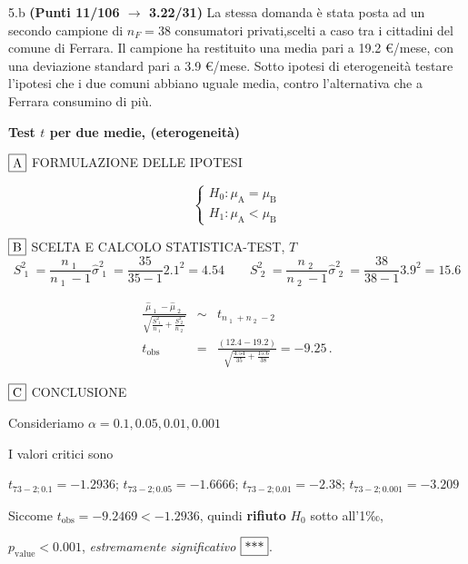 \documentclass[
  11pt,
]{book}
\theoremstyle{mytheoremstyle}
\theoremstyle{mydefstyle}
\newenvironment{sol}
  {
  \begin{tcolorbox}[enhanced,breakable,arc=0.1mm,boxrule=1pt,colback=white,colframe=iblue,
  title=\bf \fontfamily{lmss}\selectfont \hspace{.5 cm} Soluzione,drop fuzzy shadow]

}{
\end{tcolorbox}
  }
\begin{document}
5.b \textbf{(Punti 11/106 \(\rightarrow\) 3.22/31)} La stessa domanda è stata posta ad un secondo campione di \(n_F=38\) consumatori privati,scelti a caso tra i cittadini del comune di Ferrara.
Il campione ha restituito una media pari a 19.2 €/mese, con una deviazione standard pari a 3.9 €/mese. Sotto ipotesi di eterogeneità testare l'ipotesi che i due comuni abbiano uguale media, contro l'alternativa che a Ferrara consumino di più.

\begin{sol}
\textbf{Test \(t\) per due medie, (eterogeneità)}

\(\fbox{A}\) FORMULAZIONE DELLE IPOTESI

\[\begin{cases}
   H_0: \mu_\text{A} = \mu_\text{B} \\
   H_1: \mu_\text{A} < \mu_\text{B} 
   \end{cases}\]

\(\fbox{B}\) SCELTA E CALCOLO STATISTICA-TEST, \(T\)
\[
     S^2_\text{ 1 }=\frac{n_\text{ 1 }}{n_\text{ 1 }-1}\hat\sigma^2_\text{ 1 }=\frac{ 35 }{ 35 -1} 2.1 ^2= 4.54  \qquad
     S^2_\text{ 2 }=\frac{n_\text{ 2 }}{n_\text{ 2 }-1}\hat\sigma^2_\text{ 2 }=\frac{ 38 }{ 38 -1} 3.9 ^2= 15.6 
   \]

\begin{eqnarray*}
   \frac{\hat\mu_\text{ 1 } - \hat\mu_\text{ 2 }}
   {\sqrt{\frac {S^2_\text{ 1 }}{n_\text{ 1 }}+\frac {S^2_\text{ 2 }}{n_\text{ 2 }}}}&\sim&t_{n_\text{ 1 }+n_\text{ 2 }-2}\\
   t_{\text{obs}}
   &=& \frac{ ( 12.4 -  19.2 )} {\sqrt{\frac{ 4.54 }{ 35 }+\frac{ 15.6 }{ 38 }}}
   =   -9.25 \, .
   \end{eqnarray*}

\(\fbox{C}\) CONCLUSIONE

Consideriamo \(\alpha=0.1, 0.05, 0.01, 0.001\)

I valori critici sono

\(t_{73-2;0.1}=-1.2936\); \(t_{73-2;0.05}=-1.6666\); \(t_{73-2;0.01}=-2.38\); \(t_{73-2;0.001}=-3.209\)

Siccome \(t_\text{obs}=-9.2469<-1.2936\), quindi \textbf{rifiuto} \(H_0\) sotto all'1‰,

\(p_\text{value}<0.001\), \emph{estremamente significativo} \(\fbox{***}\).


\end{sol}
\end{document}
